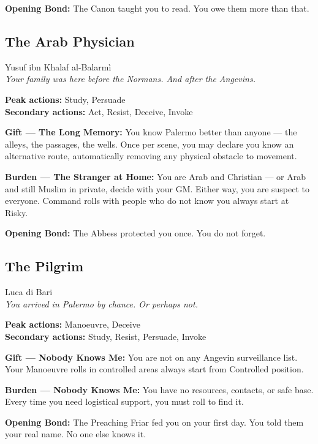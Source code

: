 \textbf{Opening Bond:} The Canon taught you to read.
You owe them more than that.

\filetto

\subsection{The Arab Physician}
{\cinzel\footnotesize\color{grigionote} Yusuf ibn Khalaf al-Balarmì}\\
\textit{Your family was here before the Normans. And after the Angevins.}

\textbf{Peak actions:} Study, Persuade\\
\textbf{Secondary actions:} Act, Resist, Deceive, Invoke

\textbf{Gift --- The Long Memory:} You know Palermo better than anyone
— the alleys, the passages, the wells. Once per scene, you may declare
you know an alternative route, automatically removing any physical
obstacle to movement.

\textbf{Burden --- The Stranger at Home:} You are Arab and Christian —
or Arab and still Muslim in private, decide with your GM. Either way,
you are suspect to everyone. Command rolls with people who do not
know you always start at Risky.

\textbf{Opening Bond:} The Abbess protected you once.
You do not forget.

\filetto

\subsection{The Pilgrim}
{\cinzel\footnotesize\color{grigionote} Luca di Bari}\\
\textit{You arrived in Palermo by chance. Or perhaps not.}

\textbf{Peak actions:} Manoeuvre, Deceive\\
\textbf{Secondary actions:} Study, Resist, Persuade, Invoke

\textbf{Gift --- Nobody Knows Me:} You are not on any Angevin
surveillance list. Your Manoeuvre rolls in controlled areas always
start from Controlled position.

\textbf{Burden --- Nobody Knows Me:} You have no resources, contacts,
or safe base. Every time you need logistical support, you must roll
to find it.

\textbf{Opening Bond:} The Preaching Friar fed you on your first day.
You told them your real name. No one else knows it.

